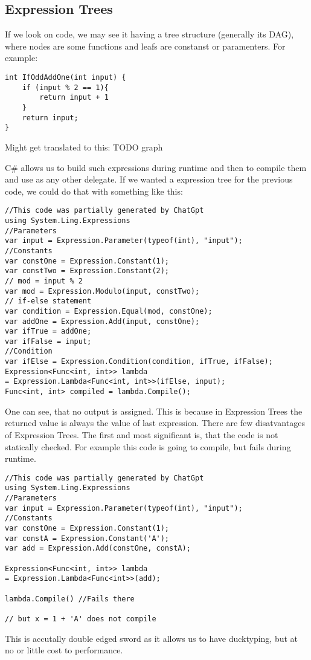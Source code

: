 \subsection{Expression Trees}
If we look on code, we may see it having a tree structure (generally its DAG), where nodes are some functions and leafs are constanst or paramenters. For example: 
\begin{lstlisting}
int IfOddAddOne(int input) {
    if (input % 2 == 1){
        return input + 1
    }
    return input;
}
\end{lstlisting}

Might get translated to this: TODO graph

\iffalse
\digraph{expressionTree1}{
  const_1 -> b0;
  input -> "+"
  const_1 -> "+"
  input -> "\%"
  "\%" -> "=="
  const_1 -> "=="
  "==" -> if [label = "check"]
  input -> if [label = "check is false"]
  "+" -> if [label = "check is true"]
}
\fi

C\# allows us to build such expressions during runtime and then to compile them and use as any other delegate.
If we wanted a expression tree for the previous code, we could do that with something like this:

\begin{lstlisting}
//This code was partially generated by ChatGpt
using System.Ling.Expressions
//Parameters
var input = Expression.Parameter(typeof(int), "input");
//Constants
var constOne = Expression.Constant(1);
var constTwo = Expression.Constant(2);
// mod = input % 2 
var mod = Expression.Modulo(input, constTwo);
// if-else statement
var condition = Expression.Equal(mod, constOne);
var addOne = Expression.Add(input, constOne);
var ifTrue = addOne;
var ifFalse = input;
//Condition
var ifElse = Expression.Condition(condition, ifTrue, ifFalse);
Expression<Func<int, int>> lambda 
= Expression.Lambda<Func<int, int>>(ifElse, input);
Func<int, int> compiled = lambda.Compile();
\end{lstlisting}

One can see, that no output is assigned. This is because in Expression Trees the returned value is always the value of last expression. There are few disatvantages of Expression Trees. The first and most significant is, that the code is not statically checked. For example this code is going to compile, but fails during runtime.

\begin{lstlisting}
//This code was partially generated by ChatGpt
using System.Ling.Expressions
//Parameters
var input = Expression.Parameter(typeof(int), "input");
//Constants
var constOne = Expression.Constant(1);
var constA = Expression.Constant('A');
var add = Expression.Add(constOne, constA);

Expression<Func<int, int>> lambda 
= Expression.Lambda<Func<int>>(add);

lambda.Compile() //Fails there 

// but x = 1 + 'A' does not compile
\end{lstlisting}
This is accutally double edged sword as it allows us to have ducktyping, but at no or little cost to performance. 




\begin{lstlisting}


\end{lstlisting}
